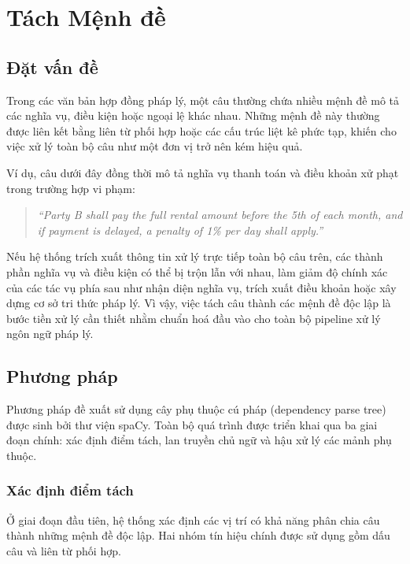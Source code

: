 \section{Tách Mệnh đề}
\label{sec:clause-splitting}

\subsection{Đặt vấn đề}

Trong các văn bản hợp đồng pháp lý, một câu thường chứa nhiều mệnh đề
mô tả các nghĩa vụ, điều kiện hoặc ngoại lệ khác nhau. Những mệnh đề này
thường được liên kết bằng liên từ phối hợp hoặc các cấu trúc liệt kê phức
tạp, khiến cho việc xử lý toàn bộ câu như một đơn vị trở nên kém hiệu quả.

Ví dụ, câu dưới đây đồng thời mô tả nghĩa vụ thanh toán và điều khoản xử
phạt trong trường hợp vi phạm:

\begin{quote}
    \textit{``Party B shall pay the full rental amount before the 5th
    of each month, and if payment is delayed, a penalty of 1\% per day
    shall apply.''}
\end{quote}

Nếu hệ thống trích xuất thông tin xử lý trực tiếp toàn bộ câu trên, các
thành phần nghĩa vụ và điều kiện có thể bị trộn lẫn với nhau, làm giảm độ
chính xác của các tác vụ phía sau như nhận diện nghĩa vụ, trích xuất điều
khoản hoặc xây dựng cơ sở tri thức pháp lý. Vì vậy, việc tách câu thành
các mệnh đề độc lập là bước tiền xử lý cần thiết nhằm chuẩn hoá đầu vào
cho toàn bộ pipeline xử lý ngôn ngữ pháp lý.

\subsection{Phương pháp}

Phương pháp đề xuất sử dụng cây phụ thuộc cú pháp (dependency parse tree)
được sinh bởi thư viện spaCy. Toàn bộ quá trình được triển khai qua ba
giai đoạn chính: xác định điểm tách, lan truyền chủ ngữ và hậu xử lý các
mảnh phụ thuộc.

\subsubsection{Xác định điểm tách}

Ở giai đoạn đầu tiên, hệ thống xác định các vị trí có khả năng phân chia
câu thành những mệnh đề độc lập. Hai nhóm tín hiệu chính được sử dụng gồm
dấu câu và liên từ phối hợp.

